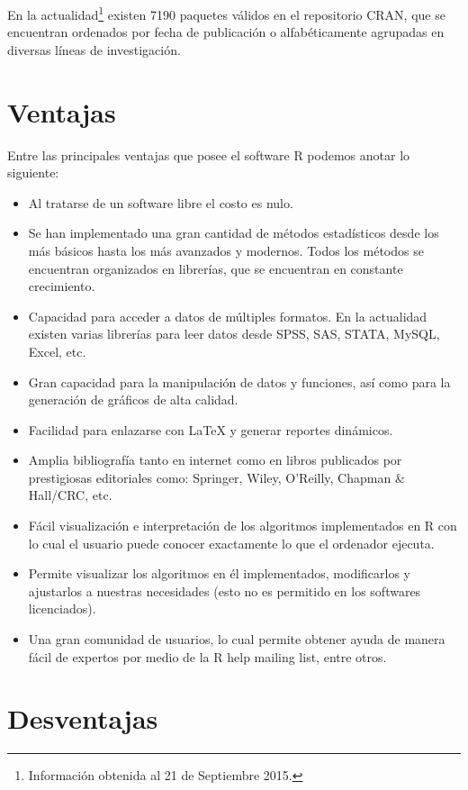 \documentclass[11pt,a4paper,oneside]{book}\usepackage[]{graphicx}\usepackage[]{color}
\begin{document}
En la actualidad\footnote{Información obtenida al 21 de Septiembre 2015.} existen 7190 paquetes válidos en el repositorio CRAN, que se encuentran ordenados por fecha de publicación o alfabéticamente agrupadas en diversas líneas de investigación.

\section{Ventajas}

Entre las principales ventajas que posee el software R podemos anotar lo siguiente:
\begin{itemize}
  \item Al tratarse de un software libre el costo es nulo.
  \item Se han implementado una gran cantidad de métodos estadísticos desde los más básicos hasta los más avanzados y modernos. Todos los métodos se encuentran organizados en librerías, que se encuentran en constante crecimiento.
  \item Capacidad para acceder a datos de múltiples formatos. En la actualidad existen varias librerías para leer datos desde SPSS, SAS, STATA, MySQL, Excel, etc.
  \item Gran capacidad para la manipulación de datos y funciones, así como para la generación de gráficos de alta calidad.
  \item Facilidad para enlazarse con LaTeX y generar reportes dinámicos.
  \item Amplia bibliografía tanto en internet como en libros publicados por prestigiosas editoriales como: Springer, Wiley, O'Reilly, Chapman $\&$ Hall/CRC, etc.
  \item Fácil visualización e interpretación de los algoritmos implementados en R con lo cual el usuario puede conocer exactamente lo que el ordenador ejecuta.
  \item Permite visualizar los algoritmos en él implementados, modificarlos y ajustarlos a nuestras necesidades (esto no es permitido en los softwares licenciados).
  \item Una gran comunidad de usuarios, lo cual permite obtener ayuda de manera fácil de expertos por medio de la R help mailing list, entre otros.
\end{itemize}

\section{Desventajas}
\end{document}
